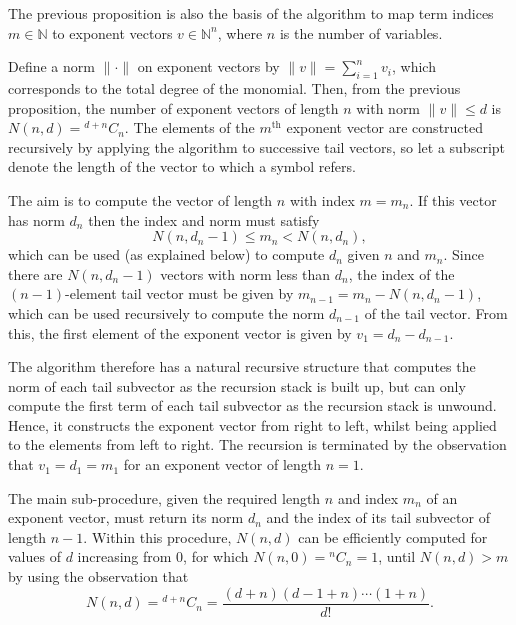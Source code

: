 The previous proposition is also the basis of the algorithm to map
term indices $m \in \mathbb{N}$ to exponent vectors $v \in \mathbb{N}^n$,
where $n$ is the number of variables.

Define a norm $\|\cdot\|$ on exponent vectors by $\|v\| = \sum_{i=1}^n
v_i$, which corresponds to the total degree of the monomial.  Then,
from the previous proposition, the number of exponent vectors of
length $n$ with norm $\|v\| \leq d$ is $N(n,d) = {}^{d+n}C_n$.  The
elements of the $m^{\text{th}}$ exponent vector are constructed recursively by
applying the algorithm to successive tail vectors, so let a subscript
denote the length of the vector to which a symbol refers.

The aim is to compute the vector of length $n$ with index $m = m_n$.
If this vector has norm $d_n$ then the index and norm must satisfy
\[
  N(n,d_n-1) \leq m_n < N(n,d_n),
\]
which can be used (as explained below) to compute $d_n$ given $n$ and
$m_n$.  Since there are $N(n,d_n-1)$ vectors with norm less than
$d_n$, the index of the $(n-1)$-element tail vector must be given by
$m_{n-1} = m_n - N(n,d_n-1)$, which can be used recursively to compute
the norm $d_{n-1}$ of the tail vector.  From this, the first element
of the exponent vector is given by $v_1 = d_n - d_{n-1}$.

The algorithm therefore has a natural recursive structure that
computes the norm of each tail subvector as the recursion stack is
built up, but can only compute the first term of each tail subvector
as the recursion stack is unwound.  Hence, it constructs the exponent
vector from right to left, whilst being applied to the elements from
left to right.  The recursion is terminated by the observation that
$v_1 = d_1 = m_1$ for an exponent vector of length $n = 1$.

The main sub-procedure, given the required length $n$ and index $m_n$
of an exponent vector, must return its norm $d_n$ and the index of its
tail subvector of length $n-1$.  Within this procedure, $N(n,d)$ can
be efficiently computed for values of $d$ increasing from 0, for which
$N(n,0) = {}^nC_n = 1$, until $N(n,d) > m$ by using the observation
that
\[
   N(n,d) = {}^{d+n}C_n = \frac{(d+n)(d-1+n)\cdots(1+n)}{d!}.
\]
